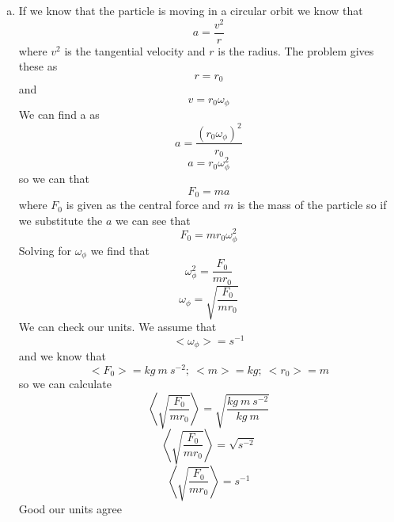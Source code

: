 \documentclass[11pt]{article}
\numberwithin{equation}{section}
\begin{document}
\begin{enumerate}[(a)]
\item
If we know that the particle is moving in a circular orbit we know that $$a = \frac{v^2}{r}$$
where $v^2$ is the tangential velocity and $r$ is the radius. The problem gives these as
$$r= r_0$$
and
$$v = r_0\omega_{\phi}$$
We can find a as
$$a = \frac{(r_0\omega_{\phi})^2}{r_0}$$
$$a = {r_0\omega_{\phi}^2}$$
so we can that 
$$F_0 = m a$$
where $F_0$ is given as the central force and $m$ is the mass of the particle so if we substitute the $a$ we can see that
$$F_0 = m r_0\omega_{\phi}^2$$
Solving for $\omega_{\phi}$ we find that 
$$\omega_{\phi}^2= \frac{F_0}{m r_0}$$
$$\omega_{\phi}= \sqrt{\frac{F_0}{m r_0}}$$
We can check our units. We assume that $$<\omega_{\phi}>= s^{-1}$$
and we know that 
$$<F_0> = kg\ m\ s^{-2};\ <m> = kg;\ <r_0>=m$$
so we can calculate 
$$\left<\sqrt{\frac{F_0}{m r_0}}\right> = \sqrt{\frac{kg\ m\ s^{-2}}{kg\ m}}$$
$$\left<\sqrt{\frac{F_0}{m r_0}}\right> = \sqrt{s^{-2}}$$
$$\left<\sqrt{\frac{F_0}{m r_0}}\right> = s^{-1}$$
Good our units agree


\end{enumerate}
\end{document}
